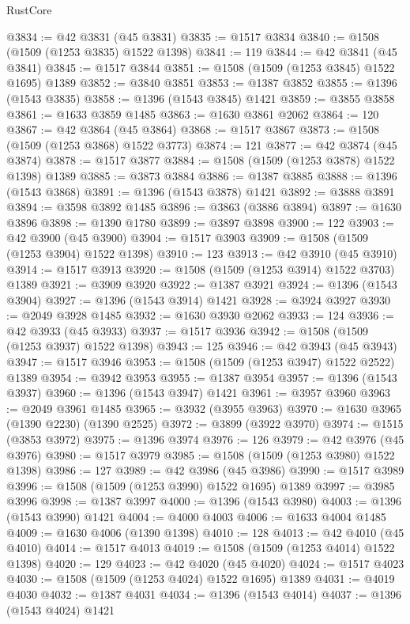\begin{lexlean}{RustCore}
\begin{coremodule}
@3834 := @42 @3831 (@45 @3831)
@3835 := @1517 @3834
@3840 := @1508 (@1509 (@1253 @3835) @1522 @1398)
@3841 := 119
@3844 := @42 @3841 (@45 @3841)
@3845 := @1517 @3844
@3851 := @1508 (@1509 (@1253 @3845) @1522 @1695) @1389
@3852 := @3840 @3851
@3853 := @1387 @3852
@3855 := @1396 (@1543 @3835)
@3858 := @1396 (@1543 @3845) @1421
@3859 := @3855 @3858
@3861 := @1633 @3859 @1485
@3863 := @1630 @3861 @2062
@3864 := 120
@3867 := @42 @3864 (@45 @3864)
@3868 := @1517 @3867
@3873 := @1508 (@1509 (@1253 @3868) @1522 @3773)
@3874 := 121
@3877 := @42 @3874 (@45 @3874)
@3878 := @1517 @3877
@3884 := @1508 (@1509 (@1253 @3878) @1522 @1398) @1389
@3885 := @3873 @3884
@3886 := @1387 @3885
@3888 := @1396 (@1543 @3868)
@3891 := @1396 (@1543 @3878) @1421
@3892 := @3888 @3891
@3894 := @3598 @3892 @1485
@3896 := @3863 (@3886 @3894)
@3897 := @1630 @3896
@3898 := @1390 @1780
@3899 := @3897 @3898
@3900 := 122
@3903 := @42 @3900 (@45 @3900)
@3904 := @1517 @3903
@3909 := @1508 (@1509 (@1253 @3904) @1522 @1398)
@3910 := 123
@3913 := @42 @3910 (@45 @3910)
@3914 := @1517 @3913
@3920 := @1508 (@1509 (@1253 @3914) @1522 @3703) @1389
@3921 := @3909 @3920
@3922 := @1387 @3921
@3924 := @1396 (@1543 @3904)
@3927 := @1396 (@1543 @3914) @1421
@3928 := @3924 @3927
@3930 := @2049 @3928 @1485
@3932 := @1630 @3930 @2062
@3933 := 124
@3936 := @42 @3933 (@45 @3933)
@3937 := @1517 @3936
@3942 := @1508 (@1509 (@1253 @3937) @1522 @1398)
@3943 := 125
@3946 := @42 @3943 (@45 @3943)
@3947 := @1517 @3946
@3953 := @1508 (@1509 (@1253 @3947) @1522 @2522) @1389
@3954 := @3942 @3953
@3955 := @1387 @3954
@3957 := @1396 (@1543 @3937)
@3960 := @1396 (@1543 @3947) @1421
@3961 := @3957 @3960
@3963 := @2049 @3961 @1485
@3965 := @3932 (@3955 @3963)
@3970 := @1630 @3965 (@1390 @2230) (@1390 @2525)
@3972 := @3899 (@3922 @3970)
@3974 := @1515 (@3853 @3972)
@3975 := @1396 @3974
@3976 := 126
@3979 := @42 @3976 (@45 @3976)
@3980 := @1517 @3979
@3985 := @1508 (@1509 (@1253 @3980) @1522 @1398)
@3986 := 127
@3989 := @42 @3986 (@45 @3986)
@3990 := @1517 @3989
@3996 := @1508 (@1509 (@1253 @3990) @1522 @1695) @1389
@3997 := @3985 @3996
@3998 := @1387 @3997
@4000 := @1396 (@1543 @3980)
@4003 := @1396 (@1543 @3990) @1421
@4004 := @4000 @4003
@4006 := @1633 @4004 @1485
@4009 := @1630 @4006 (@1390 @1398)
@4010 := 128
@4013 := @42 @4010 (@45 @4010)
@4014 := @1517 @4013
@4019 := @1508 (@1509 (@1253 @4014) @1522 @1398)
@4020 := 129
@4023 := @42 @4020 (@45 @4020)
@4024 := @1517 @4023
@4030 := @1508 (@1509 (@1253 @4024) @1522 @1695) @1389
@4031 := @4019 @4030
@4032 := @1387 @4031
@4034 := @1396 (@1543 @4014)
@4037 := @1396 (@1543 @4024) @1421

\end{coremodule}
\end{lexlean}
